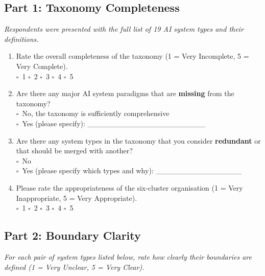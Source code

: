 \documentclass[acmlarge]{acmart}
\begin{document}
\subsection{Part 1: Taxonomy Completeness}

\textit{Respondents were presented with the full list of 19 AI system types and their definitions.}

\begin{enumerate}
  \item[\textbf{Q1.1}] Rate the overall completeness of the taxonomy (1 = Very Incomplete, 5 = Very Complete).\\
  $\square$~1 \quad $\square$~2 \quad $\square$~3 \quad $\square$~4 \quad $\square$~5

  \item[\textbf{Q1.2}] Are there any major AI system paradigms that are \textbf{missing} from the taxonomy?\\
  $\square$~No, the taxonomy is sufficiently comprehensive\\
  $\square$~Yes (please specify): \_\_\_\_\_\_\_\_\_\_\_\_\_\_\_\_\_\_\_\_\_\_

  \item[\textbf{Q1.3}] Are there any system types in the taxonomy that you consider \textbf{redundant} or that should be merged with another?\\
  $\square$~No\\
  $\square$~Yes (please specify which types and why): \_\_\_\_\_\_\_\_\_\_\_\_\_\_\_\_

  \item[\textbf{Q1.4}] Please rate the appropriateness of the six-cluster organisation (1 = Very Inappropriate, 5 = Very Appropriate).\\
  $\square$~1 \quad $\square$~2 \quad $\square$~3 \quad $\square$~4 \quad $\square$~5
\end{enumerate}

\subsection{Part 2: Boundary Clarity}

\textit{For each pair of system types listed below, rate how clearly their boundaries are defined (1 = Very Unclear, 5 = Very Clear).}
\end{document}
